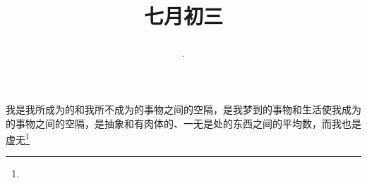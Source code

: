 \title{\date[d=6,m=8,y=2024][year:cn-y,年,month:cn,day:cn,日,·,weekday]·七月初三 }
我是我所成为的和我所不成为的事物之间的空隔，是我梦到的事物和生活使我成为的事物之间的空隔，是抽象和有肉体的、一无是处的东西之间的平均数，而我也是虚无\footnote{ }

